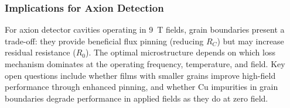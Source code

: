     
    \subsubsection{Implications for Axion Detection}
    
    For axion detector cavities operating in 9~T fields, grain boundaries present a trade-off: they provide beneficial flux pinning (reducing $R_C$) but may increase residual resistance ($R_0$). The optimal microstructure depends on which loss mechanism dominates at the operating frequency, temperature, and field. Key open questions include whether films with smaller grains improve high-field performance through enhanced pinning, and whether Cu impurities in grain boundaries degrade performance in applied fields as they do at zero field.
    

 
    
    



